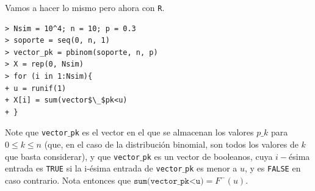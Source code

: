 Vamos a hacer lo mismo pero ahora con \texttt{R}.

\begin{verbatim}
> Nsim = 10^4; n = 10; p = 0.3
> soporte = seq(0, n, 1)
> vector_pk = pbinom(soporte, n, p)
> X = rep(0, Nsim) 
> for (i in 1:Nsim){
+ u = runif(1)
+ X[i] = sum(vector$\_$pk<u)
+ }
\end{verbatim}
Note que \texttt{vector$\_$pk} es el vector en el que
se almacenan los valores $p\_{k}$ para
$0 \leq k \leq n$ (que, en el caso de la distribución
binomial, son todos los valores de $k$ que basta considerar),
y que \texttt{vector$\_$pk} es un vector de booleanos,
cuya $i-$ésima entrada es \texttt{TRUE} si la i-ésima
entrada de \texttt{vector$\_$pk} es menor a $u$, y es 
\texttt{FALSE} en caso contrario. Nota entonces que
$\texttt{sum(vector\_pk<u)} = F^{-}(u)$. 